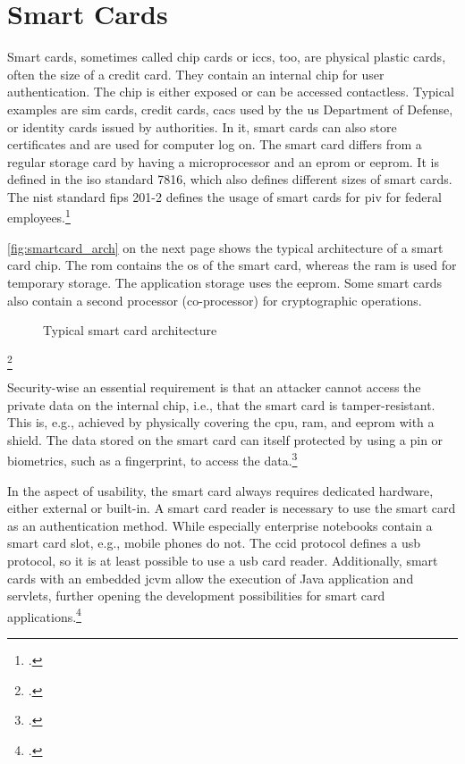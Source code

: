 \section{Smart Cards}

Smart cards, sometimes called chip cards or \glspl{icc}, too, are physical plastic cards, often the size of a credit card. They contain an internal chip for user authentication. The chip is either exposed or can be accessed contactless. Typical examples are \gls{sim} cards, credit cards, \glspl{cac} used by the \gls{us} Department of Defense, or identity cards issued by authorities. In \gls{it}, smart cards can also store certificates and are used for computer log on. The smart card differs from a regular storage card by having a microprocessor and an \gls{eprom} or \gls{eeprom}. It is defined in the \gls{iso} standard 7816, which also defines different sizes of smart cards. The \gls{nist} standard \gls{fips} 201-2 defines the usage of smart cards for \gls{piv} for federal employees.\footcites[See][525--527]{eckert-it-sec-9}[See][]{iso7816}[See][6--9]{Mayes2017}[See][]{FIPS201-2}

\autoref{fig:smartcard_arch} on the next page shows the typical architecture of a smart card chip. The \gls{rom} contains the \gls{os} of the smart card, whereas the \gls{ram} is used for temporary storage. The application storage uses the \gls{eeprom}. Some smart cards also contain a second processor (co-processor) for cryptographic operations.

\newpage

\begin{figure}[hbt]
	\centering
	
	\caption[Typical smart card architecture]{Typical smart card architecture\footnotemark}
	\label{fig:smartcard_arch}
\end{figure}
\footcitetexts[Source: diagram by author, based on][33]{electronic_certification_mobile_devices}[][228]{Tunstall2017}

Security-wise an essential requirement is that an attacker cannot access the private data on the internal chip, i.e., that the smart card is tamper-resistant. This is, e.g., achieved by physically covering the \gls{cpu}, \gls{ram}, and \gls{eeprom} with a shield. The data stored on the smart card can itself protected by using a \gls{pin} or biometrics, such as a fingerprint, to access the data.\footcites[See][34]{265831}[See][228]{Tunstall2017}

In the aspect of usability, the smart card always requires dedicated hardware, either external or built-in. A smart card reader is necessary to use the smart card as an authentication method. While especially enterprise notebooks contain a smart card slot, e.g., mobile phones do not. The \gls{ccid} protocol defines a \gls{usb} protocol, so it is at least possible to use a \gls{usb} card reader. Additionally, smart cards with an embedded \gls{jcvm} allow the execution of Java application and servlets, further opening the development possibilities for smart card applications.\footcites[See][65]{Markantonakis2017}[See][539]{eckert-it-sec-9}

